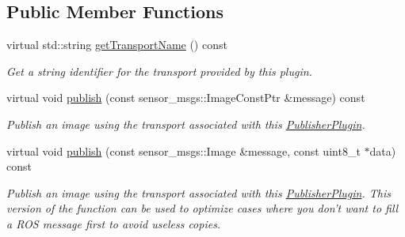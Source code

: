 \subsection*{Public Member Functions}
\begin{DoxyCompactItemize}
\item 
\hypertarget{classimage__transport_1_1_raw_publisher_adbb149bca794283f80db9df4c32f34dc}{virtual std\-::string \hyperlink{classimage__transport_1_1_raw_publisher_adbb149bca794283f80db9df4c32f34dc}{get\-Transport\-Name} () const }\label{classimage__transport_1_1_raw_publisher_adbb149bca794283f80db9df4c32f34dc}

\begin{DoxyCompactList}\small\item\em Get a string identifier for the transport provided by this plugin. \end{DoxyCompactList}\item 
\hypertarget{classimage__transport_1_1_raw_publisher_a567f1bc6ddaf5fc191fda71d4e5b4d22}{virtual void \hyperlink{classimage__transport_1_1_raw_publisher_a567f1bc6ddaf5fc191fda71d4e5b4d22}{publish} (const sensor\-\_\-msgs\-::\-Image\-Const\-Ptr \&message) const }\label{classimage__transport_1_1_raw_publisher_a567f1bc6ddaf5fc191fda71d4e5b4d22}

\begin{DoxyCompactList}\small\item\em Publish an image using the transport associated with this \hyperlink{classimage__transport_1_1_publisher_plugin}{Publisher\-Plugin}. \end{DoxyCompactList}\item 
virtual void \hyperlink{classimage__transport_1_1_raw_publisher_a62ee9d7dab3a361ad92c70a4df5d6416}{publish} (const sensor\-\_\-msgs\-::\-Image \&message, const uint8\-\_\-t $\ast$data) const 
\begin{DoxyCompactList}\small\item\em Publish an image using the transport associated with this \hyperlink{classimage__transport_1_1_publisher_plugin}{Publisher\-Plugin}. This version of the function can be used to optimize cases where you don't want to fill a R\-O\-S message first to avoid useless copies. \end{DoxyCompactList}\end{DoxyCompactItemize}
